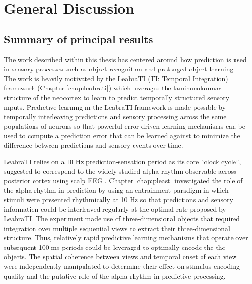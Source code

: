 \documentclass[dwyatte_dissertation.tex]{subfiles}
\begin{document}
\sloppy

\chapter{General Discussion}
\label{chap:discuss}

\section{Summary of principal results}
The work described within this thesis has centered around how prediction is used in sensory processes such as object recognition and prolonged object learning. The work is heavily motivated by the LeabraTI (TI: Temporal Integration) framework (Chapter \ref{chap:leabrati}) which leverages the laminocolumnar structure of the neocortex \cite{Mountcastle97,BuxhoevedenCasanova02,HortonAdams05} to learn to predict temporally structured sensory inputs. Predictive learning in the LeabraTI framework is made possible by temporally interleaving predictions and sensory processing across the same populations of neurons so that powerful error-driven learning mechanisms \cite{OReillyMunakata00,OReillyMunakataFrankEtAl12} can be used to compute a prediction error that can be learned against to minimize the difference between predictions and sensory events over time.

LeabraTI relies on a 10 Hz prediction-sensation period as its core ``clock cycle'', suggested to correspond to the widely studied alpha rhythm observable across posterior cortex using scalp EEG \cite{PalvaPalva07,HanslmayrGrossKlimeschEtAl11,VanRullenBuschDrewesEtAl11}. Chapter \ref{chap:pleast} investigated the role of the alpha rhythm in prediction by using an entrainment paradigm \cite{SchroederLakatosKajikawaEtAl08,CalderoneLakatosButlerEtAlInPress} in which stimuli were presented rhythmically at 10 Hz so that predictions and sensory information could be interleaved regularly at the optimal rate proposed by LeabraTI. The experiment made use of three-dimensional objects that required integration over multiple sequential views to extract their three-dimensional structure. Thus, relatively rapid predictive learning mechanisms that operate over subsequent 100 ms periods could be leveraged to optimally encode the the objects. The spatial coherence between views and temporal onset of each view were independently manipulated to determine their effect on stimulus encoding quality and the putative role of the alpha rhythm in predictive processing.
\end{document}
